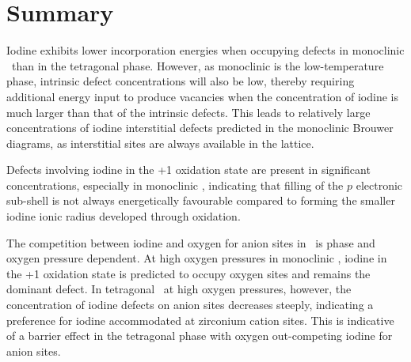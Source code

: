 \section{Summary}

Iodine exhibits lower incorporation energies when occupying defects in monoclinic \zirconia\ than in the tetragonal phase. However, as monoclinic is the low-temperature phase, intrinsic defect concentrations will also be low, thereby requiring additional energy input to produce vacancies when the concentration of iodine is much larger than that of the intrinsic defects. This leads to relatively large concentrations of iodine interstitial defects predicted in the monoclinic Brouwer diagrams, as interstitial sites are always available in the lattice. 

Defects involving iodine in the +1 oxidation state are present in significant concentrations, especially in monoclinic \zirconia , indicating that filling of the $p$ electronic sub-shell is not always energetically favourable compared to forming the smaller iodine ionic radius developed through oxidation. 

The competition between iodine and oxygen for anion sites in \zirconia\ is phase and oxygen pressure dependent. At high oxygen pressures in monoclinic \zirconia , iodine in the +1 oxidation state is predicted to occupy oxygen sites and remains the dominant defect. In tetragonal \zirconia\ at high oxygen pressures, however, the concentration of iodine defects on anion sites decreases steeply, indicating a preference for iodine accommodated at zirconium cation sites. This is indicative of a barrier effect in the tetragonal phase with oxygen out-competing iodine for anion sites.
